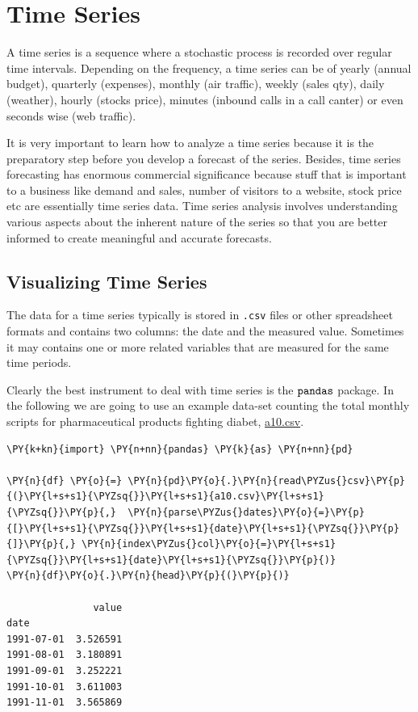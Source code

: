 \chapter{Time Series}\label{time-series}

A time series is a sequence where a stochastic process is recorded over
regular time intervals.
Depending on the frequency, a time series can be of yearly (annual
budget), quarterly (expenses), monthly (air traffic), weekly (sales
qty), daily (weather), hourly (stocks price), minutes (inbound calls in
a call canter) or even seconds wise (web traffic).

It is very important to learn how to analyze a time series because it is
the preparatory step before you develop a forecast of the series.
Besides, time series forecasting has enormous commercial significance
because stuff that is important to a business like demand and sales,
number of visitors to a website, stock price etc are essentially time
series data. Time series analysis involves understanding various aspects
about the inherent nature of the series so that you are better informed
to create meaningful and accurate forecasts.

\section{Visualizing Time Series}\label{visualizing-time-series}

The data for a time series typically is stored in \texttt{.csv} files or other
spreadsheet formats and contains two columns: the date and the measured
value. Sometimes it may contains one or more related variables that are
measured for the same time periods.

Clearly the best instrument to deal with time series is the
\(\tt{pandas}\) package. In the following we are going to use an example
data-set counting the total monthly scripts for pharmaceutical products
fighting diabet, \href{here}{a10.csv}.

\begin{tcolorbox}[breakable, size=fbox, boxrule=1pt, pad at break*=1mm,colback=cellbackground, colframe=cellborder]
\begin{Verbatim}[commandchars=\\\{\}]
\PY{k+kn}{import} \PY{n+nn}{pandas} \PY{k}{as} \PY{n+nn}{pd}

\PY{n}{df} \PY{o}{=} \PY{n}{pd}\PY{o}{.}\PY{n}{read\PYZus{}csv}\PY{p}{(}\PY{l+s+s1}{\PYZsq{}}\PY{l+s+s1}{a10.csv}\PY{l+s+s1}{\PYZsq{}}\PY{p}{,}  \PY{n}{parse\PYZus{}dates}\PY{o}{=}\PY{p}{[}\PY{l+s+s1}{\PYZsq{}}\PY{l+s+s1}{date}\PY{l+s+s1}{\PYZsq{}}\PY{p}{]}\PY{p}{,} \PY{n}{index\PYZus{}col}\PY{o}{=}\PY{l+s+s1}{\PYZsq{}}\PY{l+s+s1}{date}\PY{l+s+s1}{\PYZsq{}}\PY{p}{)}
\PY{n}{df}\PY{o}{.}\PY{n}{head}\PY{p}{(}\PY{p}{)}

               value
date
1991-07-01  3.526591
1991-08-01  3.180891
1991-09-01  3.252221
1991-10-01  3.611003
1991-11-01  3.565869
\end{Verbatim}
\end{tcolorbox}
        
